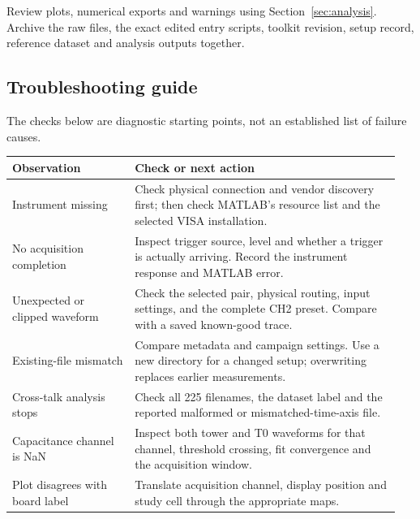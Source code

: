 Review plots, numerical exports and warnings using Section~\ref{sec:analysis}. Archive the raw files, the exact edited entry scripts, toolkit revision, setup record, reference dataset and analysis outputs together.

\subsection{Troubleshooting guide}
The checks below are diagnostic starting points, not an established list of failure causes.
\begin{longtable}{@{}p{0.30\linewidth}p{0.65\linewidth}@{}}
\toprule
Observation & Check or next action \\
\midrule
\endhead
Instrument missing & Check physical connection and vendor discovery first; then check MATLAB's resource list and the selected VISA installation. \\
No acquisition completion & Inspect trigger source, level and whether a trigger is actually arriving. Record the instrument response and MATLAB error. \\
Unexpected or clipped waveform & Check the selected pair, physical routing, input settings, and the complete CH2 preset. Compare with a saved known-good trace. \\
Existing-file mismatch & Compare metadata and campaign settings. Use a new directory for a changed setup; overwriting replaces earlier measurements. \\
Cross-talk analysis stops & Check all 225 filenames, the dataset label and the reported malformed or mismatched-time-axis file. \\
Capacitance channel is NaN & Inspect both tower and T0 waveforms for that channel, threshold crossing, fit convergence and the acquisition window. \\
Plot disagrees with board label & Translate acquisition channel, display position and study cell through the appropriate maps. \\
\bottomrule
\end{longtable}

